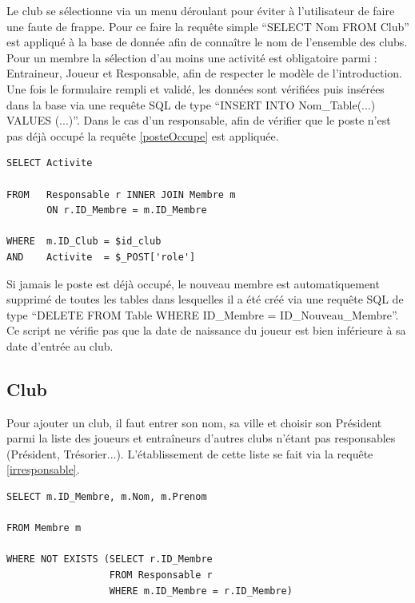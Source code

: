 \documentclass[a4paper,8pt,french,fleqn]{report}
\begin{document}
Le club se sélectionne via un menu déroulant pour éviter à l'utilisateur de faire une faute de frappe. Pour ce faire la requête simple ``SELECT Nom FROM Club'' est appliqué à la base de donnée afin de connaître le nom de l'ensemble des clubs. \\

 Pour un membre la sélection d'au moins une activité est obligatoire parmi : Entraineur, Joueur et Responsable, afin de respecter le modèle de l'introduction. Une fois le formulaire rempli et validé, les données sont vérifiées puis insérées dans la base via une requête SQL de type ``INSERT INTO Nom\_Table(...) VALUES (...)''. Dans le cas d'un responsable, afin de vérifier que le poste n'est pas déjà occupé la requête \ref{posteOccupe} est appliquée.

\begin{lstlisting}
SELECT Activite

FROM   Responsable r INNER JOIN Membre m
       ON r.ID_Membre = m.ID_Membre

WHERE  m.ID_Club = $id_club
AND    Activite  = $_POST['role']
\end{lstlisting}  

Si jamais le poste est déjà occupé, le nouveau membre est automatiquement supprimé de toutes les tables dans lesquelles il a été créé via une requête SQL de type ``DELETE FROM Table WHERE ID\_Membre = ID\_Nouveau\_Membre''. Ce script ne vérifie pas que la date de naissance du joueur est bien inférieure à sa date d'entrée au club.

\subsection{Club}
Pour ajouter un club, il faut entrer son nom, sa ville et choisir son Président parmi la liste des joueurs et entraîneurs d'autres clubs n'étant pas responsables (Président, Trésorier...). L'établissement de cette liste se fait via la requête \ref{irresponsable}.

\begin{lstlisting}
SELECT m.ID_Membre, m.Nom, m.Prenom 

FROM Membre m

WHERE NOT EXISTS (SELECT r.ID_Membre 
                  FROM Responsable r 
                  WHERE m.ID_Membre = r.ID_Membre)
\end{lstlisting}  
\end{document}

